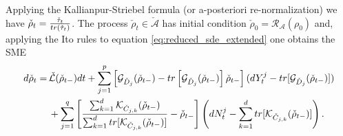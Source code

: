 \documentclass[aihp,12pt]{imsart}
\newcommand{\Gc}{\mathcal{G}}
\newcommand{\Rc}{\mathcal{R}}
\newcommand{\Kc}{\mathcal{K}}
\newcommand{\Lc}{\mathcal{L}}
\newcommand{\As}{\mathscr{A}}
\newcommand{\tr}{{\rm tr}}
\theoremstyle{theorem}
\theoremstyle{definition}
\theoremstyle{remark}
\begin{document}
Applying the Kallianpur-Striebel formula \cite[Theorem 6.2]{bouten2007introduction} (or a-posteriori re-normalization) we have $\check{\rho}_t = \frac{\check{\tau}_t}{\tr(\check{\tau}_t)}$. The process $\check{\rho}_t\in\check{\As}$ has initial condition $\check{\rho}_0 = \Rc_\As(\rho_0)$ and, applying the Ito rules to equation \eqref{eq:reduced_sde_extended} one obtains the SME 
\begin{equation}
\begin{split}
    d\check{\rho}_t =\,& \check{\Lc}(\check{\rho}_{t-}) dt + \sum_{j=1}^{p}\left[\Gc_{\check{D}_j}(\check{\rho}_{t-}) - \tr\left[\Gc_{\check{D}_j}(\check{\rho}_{t-})\right]\check{\rho}_{t-}\right](dY_t^j - \tr[\Gc_{\check{D}_j}(\check{\rho}_{t-})]) \\
    &+ \sum_{j=1}^{q}  \left[ \frac{\sum_{k=1}^{d}\Kc_{\check{C}_{j,k}}(\check{\rho}_{t-})}{\sum_{k=1}^{d}\tr[\Kc_{\check{C}_{j,k}}(\check{\rho}_{t-})]} - \check{\rho}_{t-} \right]\left(dN_t^{j} - \sum_{k=1}^{d}\tr[\Kc_{\check{C}_{j,k}}(\check{\rho}_{t-})]\right).
\end{split}
\label{eq:reduced_SME}
\end{equation}
\end{document}
